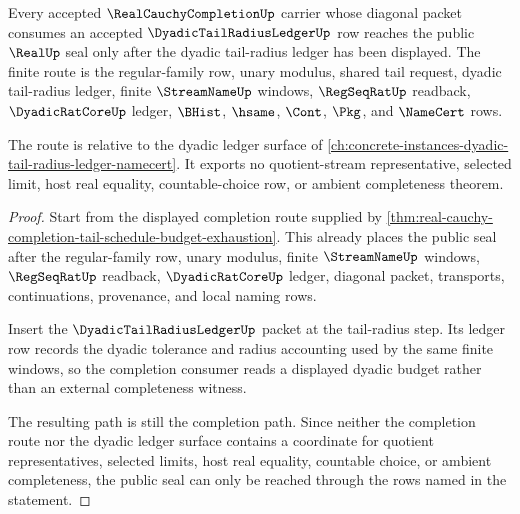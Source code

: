 \begin{theorem}
\label{thm:real-cauchy-completion-dyadic-tail-radius-ledger-route}
Every accepted $\RealCauchyCompletionUp$ carrier whose diagonal packet consumes an accepted $\DyadicTailRadiusLedgerUp$ row reaches the public $\RealUp$ seal only after the dyadic tail-radius ledger has been displayed. The finite route is the regular-family row, unary modulus, shared tail request, dyadic tail-radius ledger, finite $\StreamNameUp$ windows, $\RegSeqRatUp$ readback, $\DyadicRatCoreUp$ ledger, $\BHist$, $\hsame$, $\Cont$, $\Pkg$, and $\NameCert$ rows.

The route is relative to the dyadic ledger surface of \autoref{ch:concrete-instances-dyadic-tail-radius-ledger-namecert}. It exports no quotient-stream representative, selected limit, host real equality, countable-choice row, or ambient completeness theorem.
\end{theorem}
\begin{proof}
Start from the displayed completion route supplied by \autoref{thm:real-cauchy-completion-tail-schedule-budget-exhaustion}. This already places the public seal after the regular-family row, unary modulus, finite $\StreamNameUp$ windows, $\RegSeqRatUp$ readback, $\DyadicRatCoreUp$ ledger, diagonal packet, transports, continuations, provenance, and local naming rows.

Insert the $\DyadicTailRadiusLedgerUp$ packet at the tail-radius step. Its ledger row records the dyadic tolerance and radius accounting used by the same finite windows, so the completion consumer reads a displayed dyadic budget rather than an external completeness witness.

The resulting path is still the completion path. Since neither the completion route nor the dyadic ledger surface contains a coordinate for quotient representatives, selected limits, host real equality, countable choice, or ambient completeness, the public seal can only be reached through the rows named in the statement.
\end{proof}

